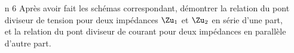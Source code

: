 \documentclass[a4paper, 10pt, final, garamond]{book}
\begin{document}
\begin{enumerate}[label=\sqenumi]
	\item[n]{6}%
	      Après avoir fait les schémas correspondant, démontrer la relation du
	      pont diviseur de tension pour deux impédances $\Zu_1$ et $\Zu_2$ en
	      série d'une part, et la relation du pont diviseur de courant pour deux
	      impédances en parallèle d'autre part.
	      \smallbreak
	      \begin{isd}[]
		      \begin{center}
		      \end{center}
		      \psw{%
			      \[
				      \Iu \stm{=} \frac{\Uu\ind{brch}}{\Zu\ind{brch}} = \frac{\Uu_k}{\Zu_k}
				      \Lra
				      \boxed{
					      \Uu_k \stm{=} \frac{\Zu_k}{\Zu\ind{brch}}\Uu\ind{brch}
				      }%
			      \]
		      }%
		      \tcblower
		      \begin{center}

\end{center}
\end{isd}
\end{enumerate}
\end{document}
